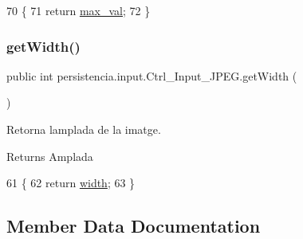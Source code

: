 \begin{DoxyCode}
70                            \{
71         \textcolor{keywordflow}{return} \hyperlink{classpersistencia_1_1input_1_1Ctrl__Input__JPEG_a8720235be6a11ef90085217064bbb1b0}{max\_val};
72     \}
\end{DoxyCode}
\mbox{\label{classpersistencia_1_1input_1_1Ctrl__Input__JPEG_ab4cd4c26db5bd1ce89f6e53458c99ba8}} 
\subsubsection{\texorpdfstring{get\+Width()}{getWidth()}}
{\footnotesize\ttfamily public int persistencia.\+input.\+Ctrl\+\_\+\+Input\+\_\+\+J\+P\+E\+G.\+get\+Width (\begin{DoxyParamCaption}{ }\end{DoxyParamCaption})\hspace{0.3cm}{\ttfamily [inline]}}



Retorna l\textquotesingle{}amplada de la imatge. 

\begin{DoxyReturn}{Returns}
Amplada 
\end{DoxyReturn}

\begin{DoxyCode}
61                           \{
62         \textcolor{keywordflow}{return} \hyperlink{classpersistencia_1_1input_1_1Ctrl__Input__JPEG_a07d902b25b54941dc0444398c7d380e7}{width};
63     \}
\end{DoxyCode}


\subsection{Member Data Documentation}
\mbox{\label{classpersistencia_1_1input_1_1Ctrl__Input__JPEG_a9e6805b998e58981f8cd7b8b6e609f27}} 

